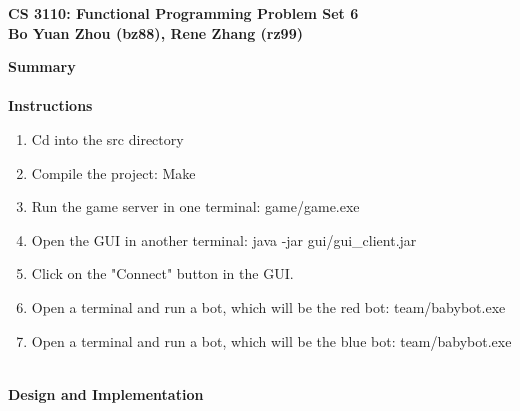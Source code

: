 \documentclass{article}[12pt]
\begin{document}
\begin{framed}
\noindent
\large{\textbf{CS 3110: Functional Programming \hfill Problem Set 6\\Bo Yuan Zhou (bz88), Rene Zhang (rz99)}}
\end{framed}

\noindent
\Large{\textbf{Summary}}
\hspace*{\fill}\\

\hspace*{\fill}\\[\baselineskip]
\Large{\textbf{Instructions}}
\begin{enumerate}
	\item Cd into the src directory
	\item Compile the project: Make
	\item Run the game server in one terminal: game/game.exe
	\item Open the GUI in another terminal: java -jar gui/gui\_client.jar
	\item Click on the "Connect" button in the GUI.
	\item Open a terminal and run a bot, which will be the red bot: team/babybot.exe
	\item Open a terminal and run a bot, which will be the blue bot: team/babybot.exe
\end{enumerate}
\hspace*{\fill}\\
\Large{\textbf{Design and Implementation}}
\end{document}
